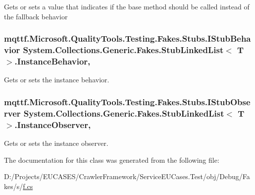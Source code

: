 Gets or sets a value that indicates if the base method should be called instead of the fallback behavior

\hypertarget{class_system_1_1_collections_1_1_generic_1_1_fakes_1_1_stub_linked_list_3_01_t_01_4_a7326712fa30d8b298dd6933adf2bfd77}{
\subsubsection[{Instance\-Behavior}]{\setlength{\rightskip}{0pt plus 5cm}mqttf.\-Microsoft.\-Quality\-Tools.\-Testing.\-Fakes.\-Stubs.\-I\-Stub\-Behavior System.\-Collections.\-Generic.\-Fakes.\-Stub\-Linked\-List$<$ T $>$.Instance\-Behavior\hspace{0.3cm}{\ttfamily [get]}, {\ttfamily [set]}}}\label{class_system_1_1_collections_1_1_generic_1_1_fakes_1_1_stub_linked_list_3_01_t_01_4_a7326712fa30d8b298dd6933adf2bfd77}


Gets or sets the instance behavior.

\hypertarget{class_system_1_1_collections_1_1_generic_1_1_fakes_1_1_stub_linked_list_3_01_t_01_4_a48f42bde28b7851ce99a9b3744339e83}{
\subsubsection[{Instance\-Observer}]{\setlength{\rightskip}{0pt plus 5cm}mqttf.\-Microsoft.\-Quality\-Tools.\-Testing.\-Fakes.\-Stubs.\-I\-Stub\-Observer System.\-Collections.\-Generic.\-Fakes.\-Stub\-Linked\-List$<$ T $>$.Instance\-Observer\hspace{0.3cm}{\ttfamily [get]}, {\ttfamily [set]}}}\label{class_system_1_1_collections_1_1_generic_1_1_fakes_1_1_stub_linked_list_3_01_t_01_4_a48f42bde28b7851ce99a9b3744339e83}


Gets or sets the instance observer.



The documentation for this class was generated from the following file\-:\begin{DoxyCompactItemize}
\item 
D\-:/\-Projects/\-E\-U\-C\-A\-S\-E\-S/\-Crawler\-Framework/\-Service\-E\-U\-Cases.\-Test/obj/\-Debug/\-Fakes/s/\hyperlink{s_2f_8cs}{f.\-cs}\end{DoxyCompactItemize}
